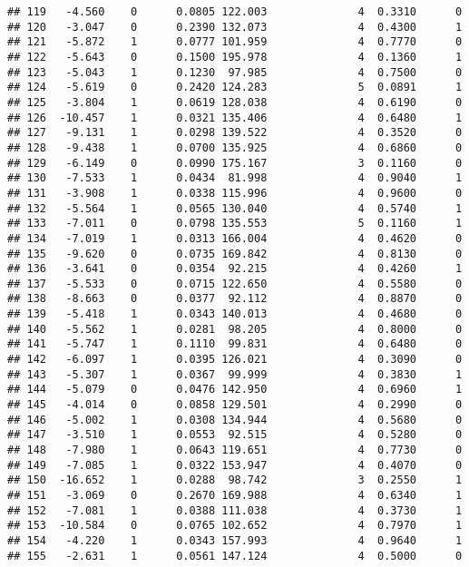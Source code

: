 \documentclass[
]{article}
\begin{document}
\begin{verbatim}
## 119   -4.560    0      0.0805 122.003              4  0.3310      0
## 120   -3.047    0      0.2390 132.073              4  0.4300      1
## 121   -5.872    1      0.0777 101.959              4  0.7770      0
## 122   -5.643    0      0.1500 195.978              4  0.1360      1
## 123   -5.043    1      0.1230  97.985              4  0.7500      0
## 124   -5.619    0      0.2420 124.283              5  0.0891      1
## 125   -3.804    1      0.0619 128.038              4  0.6190      0
## 126  -10.457    1      0.0321 135.406              4  0.6480      1
## 127   -9.131    1      0.0298 139.522              4  0.3520      0
## 128   -9.438    1      0.0700 135.925              4  0.6860      0
## 129   -6.149    0      0.0990 175.167              3  0.1160      0
## 130   -7.533    1      0.0434  81.998              4  0.9040      1
## 131   -3.908    1      0.0338 115.996              4  0.9600      0
## 132   -5.564    1      0.0565 130.040              4  0.5740      1
## 133   -7.011    0      0.0798 135.553              5  0.1160      1
## 134   -7.019    1      0.0313 166.004              4  0.4620      0
## 135   -9.620    0      0.0735 169.842              4  0.8130      0
## 136   -3.641    0      0.0354  92.215              4  0.4260      1
## 137   -5.533    0      0.0715 122.650              4  0.5580      0
## 138   -8.663    0      0.0377  92.112              4  0.8870      0
## 139   -5.418    1      0.0343 140.013              4  0.4680      0
## 140   -5.562    1      0.0281  98.205              4  0.8000      0
## 141   -5.747    1      0.1110  99.831              4  0.6480      0
## 142   -6.097    1      0.0395 126.021              4  0.3090      0
## 143   -5.307    1      0.0367  99.999              4  0.3830      1
## 144   -5.079    0      0.0476 142.950              4  0.6960      1
## 145   -4.014    0      0.0858 129.501              4  0.2990      0
## 146   -5.002    1      0.0308 134.944              4  0.5680      0
## 147   -3.510    1      0.0553  92.515              4  0.5280      0
## 148   -7.980    1      0.0643 119.651              4  0.7730      0
## 149   -7.085    1      0.0322 153.947              4  0.4070      0
## 150  -16.652    1      0.0288  98.742              3  0.2550      1
## 151   -3.069    0      0.2670 169.988              4  0.6340      1
## 152   -7.081    1      0.0388 111.038              4  0.3730      1
## 153  -10.584    0      0.0765 102.652              4  0.7970      1
## 154   -4.220    1      0.0343 157.993              4  0.9640      1
## 155   -2.631    1      0.0561 147.124              4  0.5000      0

\end{verbatim}
\end{document}
